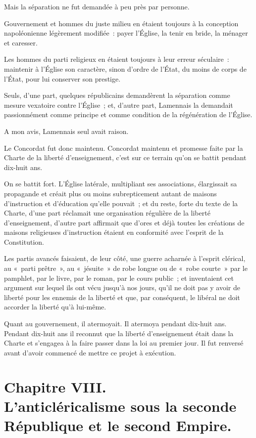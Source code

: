 \documentclass[french,twoside]{book} %
\begin{document}
Mais la séparation ne fut demandée à peu près par personne.\par
Gouvernement et hommes du juste milieu en étaient toujours à la conception napoléonienne légèrement modifiée : payer l’Église, la tenir en bride, la ménager et caresser.\par
Les hommes du parti religieux en étaient toujours à leur erreur séculaire : maintenir à l’Église son caractère, sinon d’ordre de l’État, du moins de corps de l’État, pour lui conserver son prestige.\par
Seuls, d’une part, quelques républicains demandèrent la séparation comme mesure vexatoire contre l’Église ; et, d’autre part, Lamennais la demandait passionnément comme principe et comme condition de la régénération de l’Église.\par
A mon avis, Lamennais seul avait raison.\par
Le Concordat fut donc maintenu. Concordat maintenu et promesse faite par la Charte de la liberté d’enseignement, c’est sur ce terrain qu’on se battit pendant dix-huit ans.\par
 On se battit fort. L’Église latérale, multipliant ses associations, élargissait sa propagande et créait plus ou moins subrepticement autant de maisons d’instruction et d’éducation qu’elle pouvait ; et du reste, forte du texte de la Charte, d’une part réclamait une organisation régulière de la liberté d’enseignement, d’autre part affirmait que d’ores et déjà toutes les créations de maisons religieuses d’instruction étaient en conformité avec l’esprit de la Constitution.\par
Les partis avancés faisaient, de leur côté, une guerre acharnée à l’esprit clérical, au « parti prêtre », au « jésuite » de robe longue ou de « robe courte » par le pamphlet, par le livre, par le roman, par le cours public ; et inventaient cet argument sur lequel ils ont vécu jusqu’à nos jours, qu’il ne doit pas y avoir de liberté pour les ennemis de la liberté et que, par conséquent, le libéral ne doit accorder la liberté qu’à lui-même.\par
Quant au gouvernement, il atermoyait. Il atermoya pendant dix-huit ans. Pendant dix-huit ans il reconnut que la liberté d’enseignement était dans la Charte et s’engagea à la faire passer dans la loi au premier jour. Il fut renversé avant d’avoir commencé de mettre ce projet à exécution.
 \section[{Chapitre VIII. L’anticléricalisme sous la seconde République et le second Empire.}]{Chapitre VIII.\\
L’anticléricalisme sous la seconde République et le second Empire.}\renewcommand{\leftmark}{Chapitre VIII.\\
L’anticléricalisme sous la seconde République et le second Empire.}
\end{document}
